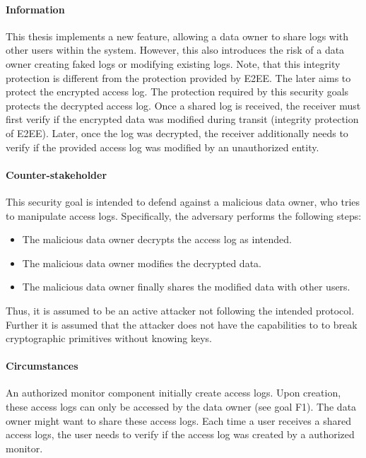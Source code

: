 \documentclass[../main.tex]{subfiles}
\begin{document}
\paragraph{Information}
This thesis implements a new feature, allowing a data owner to share logs with other users within the system.
However, this also introduces the risk of a data owner creating faked logs or modifying existing logs.
Note, that this integrity protection is different from the protection provided by E2EE.
The later aims to protect the encrypted access log.
The protection required by this security goals protects the decrypted access log.
Once a shared log is received, the receiver must first verify if the encrypted data was modified during transit (integrity protection of E2EE).
Later, once the log was decrypted, the receiver additionally needs to verify if the provided access log was modified by an unauthorized entity.
       
\paragraph{Counter-stakeholder}
This security goal is intended to defend against a malicious data owner, who tries to manipulate access logs. 
Specifically, the adversary performs the following steps:
\begin{itemize}
    \item The malicious data owner decrypts the access log as intended.
    \item The malicious data owner modifies the decrypted data.
    \item The malicious data owner finally shares the modified data with other users.
\end{itemize}
Thus, it is assumed to be an active attacker not following the intended protocol.
Further it is assumed that the attacker does not have the capabilities to to break cryptographic primitives without knowing keys.

\paragraph{Circumstances}
An authorized monitor component initially create access logs. 
Upon creation, these access logs can only be accessed by the data owner (see goal F1).
The data owner might want to share these access logs.
Each time a user receives a shared access logs, the user needs to verify if the access log was created by a authorized monitor.
\end{document}
